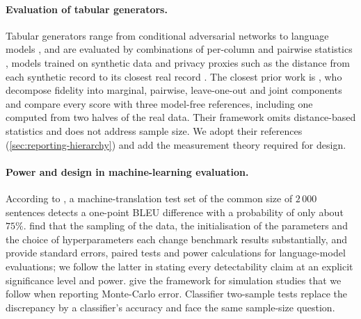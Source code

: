 \documentclass[twoside,11pt]{article}
\theoremstyle{plain}
\theoremstyle{definition}
\theoremstyle{remark}
\begin{document}
\paragraph{Evaluation of tabular generators.}
Tabular generators range from conditional adversarial networks
\citep{xu2019} to language models \citep{borisov2023}, and are evaluated by combinations of per-column and pairwise statistics
\citep{yang2024}, models trained on synthetic data
\citep{patki2016,esteban2017} and privacy proxies such as the distance
from each synthetic record to its closest real record \citep{park2018}.
The closest prior work is \citet{yang2024}, who decompose fidelity into
marginal, pairwise, leave-one-out and joint components and compare every
score with three model-free references, including one computed from two
halves of the real data. Their framework omits distance-based statistics
and does not address sample size. We adopt their references
(\cref{sec:reporting-hierarchy}) and add the measurement theory required
for design.

\paragraph{Power and design in machine-learning evaluation.}
According to \citet{card2020}, a machine-translation test set of the
common size of $2\,000$ sentences detects a one-point BLEU difference with
a probability of only about $75\%$. \citet{bouthillier2021} find that the sampling of the data, the
initialisation of the parameters and the choice of hyperparameters each
change benchmark results substantially, and \citet{miller2024} provide
standard errors, paired tests and power calculations for language-model
evaluations; we follow the latter in stating every detectability claim at
an explicit significance level and power. \citet{morris2019} give the
framework for simulation studies that we follow when reporting Monte-Carlo
error. Classifier two-sample tests \citep{friedman2003,lopezpaz2017} replace the
discrepancy by a classifier's accuracy and face the same sample-size
question.
\end{document}
